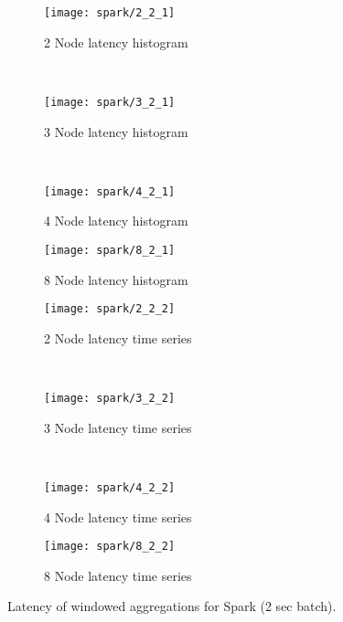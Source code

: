 




\begin{figure*}
    \centering
    \begin{subfigure}[b]{0.49\textwidth}
        \texttt{[image: spark/2\_2\_1]}
        \caption{2 Node latency histogram}
        \label{fig_no_queue}
    \end{subfigure}
    ~ %
    \begin{subfigure}[b]{0.49\textwidth}
        \texttt{[image: spark/3\_2\_1]}
        \caption{3 Node latency histogram}
        \label{fig_yes_queue}
    \end{subfigure}
    ~ %
    \begin{subfigure}[b]{0.49\textwidth}
        \texttt{[image: spark/4\_2\_1]}
        \caption{4 Node latency histogram}
        \label{fig_partial_queue}
    \end{subfigure}
        \begin{subfigure}[b]{0.49\textwidth}
        \texttt{[image: spark/8\_2\_1]}
        \caption{8 Node latency histogram}
        \label{fig_partial_queue}
    \end{subfigure}


    \begin{subfigure}[b]{0.49\textwidth}
        \texttt{[image: spark/2\_2\_2]}
        \caption{2 Node latency time series}
        \label{fig_no_queue}
    \end{subfigure}
    ~ %
    \begin{subfigure}[b]{0.49\textwidth}
        \texttt{[image: spark/3\_2\_2]}
        \caption{3 Node latency time series}
        \label{fig_yes_queue}
    \end{subfigure}
    ~ %
    \begin{subfigure}[b]{0.49\textwidth}
        \texttt{[image: spark/4\_2\_2]}
        \caption{4 Node latency time series}
        \label{fig_partial_queue}
    \end{subfigure}
        \begin{subfigure}[b]{0.49\textwidth}
        \texttt{[image: spark/8\_2\_2]}
        \caption{8 Node latency time series}
        \label{fig_partial_queue}
    \end{subfigure}

    \label{fig_flink_agg_1}
        \caption{Latency of windowed aggregations for Spark (2 sec batch).}
\end{figure*}





